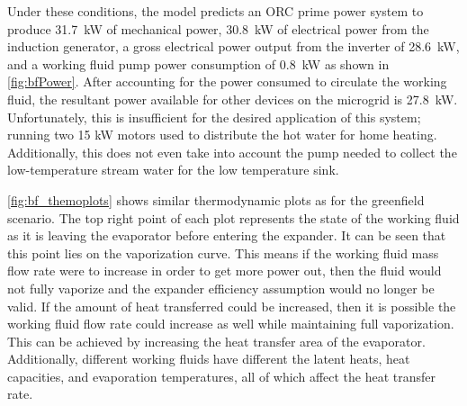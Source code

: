 Under these conditions, the model predicts an ORC prime power system to produce \SI{31.7}{\kilo\watt} of mechanical power, \SI{30.8}{\kilo\watt} of electrical power from the induction generator, a gross electrical power output from the inverter of \SI{28.6}{\kilo\watt}, and a working fluid pump power consumption of \SI{0.8}{\kilo\watt} as shown in \autoref{fig:bfPower}. After accounting for the power consumed to circulate the working fluid, the resultant power available for other devices on the microgrid is \SI{27.8}{\kilo\watt}. Unfortunately, this is insufficient for the desired application of this system;  running two 15 kW motors used to distribute the hot water for home heating. Additionally, this does not even take into account the pump needed to collect the low-temperature stream water for the low temperature sink.


\autoref{fig:bf_themoplots} shows similar thermodynamic plots as for the greenfield scenario. The top right point of each plot represents the state of the working fluid as it is leaving the evaporator before entering the expander. It can be seen that this point lies on the vaporization curve. This means if the working fluid mass flow rate were to increase in order to get more power out, then the fluid would not fully vaporize and the expander efficiency assumption would no longer be valid.
If the amount of heat transferred could be increased, then it is possible the working fluid flow rate could increase as well while maintaining full vaporization. This can be achieved by increasing the heat transfer area of the evaporator. Additionally, different working fluids have different the latent heats, heat capacities, and evaporation temperatures, all of which affect the heat transfer rate.


\cleardoublepage